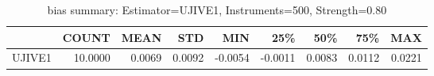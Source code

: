 \begin{table}[ht]
\centering
\caption{bias summary: Estimator=UJIVE1, Instruments=500, Strength=0.80}
\begin{tabular}{lrrrrrrrr}
\toprule
 & COUNT & MEAN & STD & MIN & 25\% & 50\% & 75\% & MAX \\
\midrule
UJIVE1 & 10.0000 & 0.0069 & 0.0092 & -0.0054 & -0.0011 & 0.0083 & 0.0112 & 0.0221 \\
\bottomrule
\end{tabular}
\end{table}
